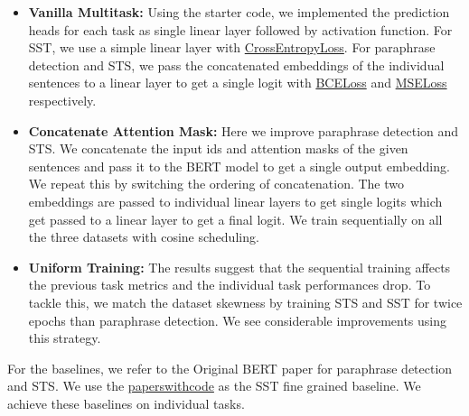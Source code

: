 \documentclass{article}
\begin{document}
\begin{itemize}
    
    \item \textbf{Vanilla Multitask:} Using the starter code, we implemented the prediction heads for each task as single linear layer followed by activation function. For SST, we use a simple linear layer with \href{https://pytorch.org/docs/stable/generated/torch.nn.CrossEntropyLoss.html}{CrossEntropyLoss}. For paraphrase detection and STS, we pass the concatenated embeddings of the individual sentences to a linear layer to get a single logit with \href{https://pytorch.org/docs/stable/generated/torch.nn.BCELoss.html}{BCELoss} and  \href{https://pytorch.org/docs/stable/generated/torch.nn.MSELoss.html}{MSELoss} respectively.

    \item \textbf{Concatenate Attention Mask:} Here we improve paraphrase detection and STS. We concatenate the input ids and attention masks of the given sentences and pass it to the BERT model to get a single output embedding. We repeat this by switching the ordering of concatenation. The two embeddings are passed to individual linear layers to get single logits which get passed to a linear layer to get a final logit. We train sequentially on all the three datasets with cosine scheduling.

    \item \textbf{Uniform Training:} The results suggest that the sequential training affects the previous task metrics and the individual task performances drop. To tackle this, we match the dataset skewness by training STS and SST for twice epochs than paraphrase detection. We see considerable improvements using this strategy. 
\end{itemize}

For the baselines, we refer to the Original BERT paper \cite{bert} for paraphrase detection and STS. We use the \href{https://paperswithcode.com/sota/sentiment-analysis-on-sst-5-fine-grained}{paperswithcode} as the SST fine grained baseline. We achieve these baselines on individual tasks.

\end{document}
